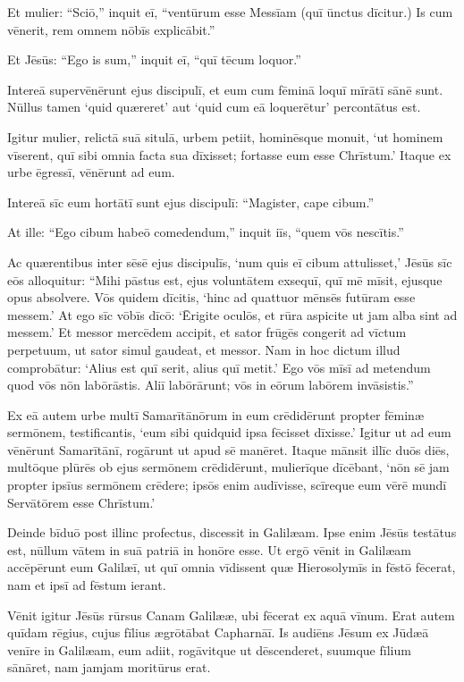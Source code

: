 \Versus Et mulier: ``Sciō,'' inquit eī, ``ventūrum esse Messīam (quī ūnctus dīcitur.) Is cum vēnerit, rem omnem nōbīs explicābit.''

\Versus Et Jēsūs: ``Ego is sum,'' inquit eī, ``quī tēcum loquor.''

\Versus Intereā supervēnērunt ejus discipulī, et eum cum fēminā loquī mīrātī sānē sunt. Nūllus tamen `quid quæreret' aut `quid cum eā loquerētur' percontātus est.

\Versus Igitur mulier, relictā suā situlā, urbem petiit, hominēsque monuit,
\Versus `ut hominem vīserent, quī sibi omnia facta sua dīxisset; fortasse eum esse Chrīstum.'
\Versus Itaque ex urbe ēgressī, vēnērunt ad eum.

\Versus Intereā sīc eum hortātī sunt ejus discipulī: ``Magister, cape cibum.''

\Versus At ille: ``Ego cibum habeō comedendum,'' inquit iīs, ``quem vōs nescītis.''

\Versus Ac quærentibus inter sēsē ejus discipulīs, `num quis eī cibum attulisset,'
\Versus Jēsūs sīc eōs alloquitur: ``Mihi pāstus est, ejus voluntātem exsequī, quī mē mīsit, ejusque opus absolvere.
\Versus Vōs quidem dīcitis, `hinc ad quattuor mēnsēs futūram esse messem.' At ego sīc vōbīs dīcō: `Ērigite oculōs, et rūra aspicite ut jam alba sint ad messem.'
\Versus Et messor mercēdem accipit, et sator frūgēs congerit ad vīctum perpetuum, ut sator simul gaudeat, et messor.
\Versus Nam in hoc dictum illud comprobātur: `Alius est quī serit, alius quī metit.'
\Versus Ego vōs mīsī ad metendum quod vōs nōn labōrāstis. Aliī labōrārunt; vōs in eōrum labōrem invāsistis.''

\Versus Ex eā autem urbe multī Samarītānōrum in eum crēdidērunt propter fēminæ sermōnem, testificantis, `eum sibi quidquid ipsa fēcisset dīxisse.'
\Versus Igitur ut ad eum vēnērunt Samarītānī, rogārunt ut apud sē manēret. Itaque mānsit illīc duōs diēs,
\Versus multōque plūrēs ob ejus sermōnem crēdidērunt,
\Versus mulierīque dīcēbant, `nōn sē jam propter ipsīus sermōnem crēdere; ipsōs enim audīvisse, scīreque eum vērē mundī Servātōrem esse Chrīstum.'

\Versus Deinde bīduō post illinc profectus, discessit in Galilæam.
\Versus Ipse enim Jēsūs testātus est, nūllum vātem in suā patriā in honōre esse.
\Versus Ut ergō vēnit in Galilæam accēpērunt eum Galilæī, ut quī omnia vīdissent quæ Hierosolymīs in fēstō fēcerat, nam et ipsī ad fēstum ierant.

\Versus Vēnit igitur Jēsūs rūrsus Canam Galilææ, ubi fēcerat ex aquā vīnum. Erat autem quīdam rēgius, cujus fīlius ægrōtābat Capharnāī.
\Versus Is audiēns Jēsum ex Jūdæā venīre in Galilæam, eum adiit, rogāvitque ut dēscenderet, suumque fīlium sānāret, nam jamjam moritūrus erat.


